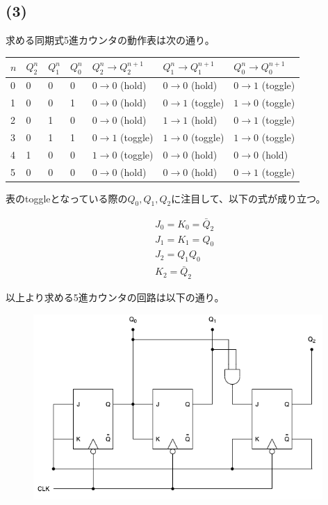 \documentclass[a4paper,12pt,xelatex,ja=standard]{bxjsarticle}
\begin{document}
\subsection*{(3)}

求める同期式5進カウンタの動作表は次の通り。

\begin{table}[H]
  \centering
  \begin{tabular}{|l|l|l|l|l|l|l|}
  \hline
  $n$ & $Q^n_2$ & $Q^n_1$ & $Q^n_0$ & $Q^n_2 \to Q^{n+1}_2$ & $Q^n_1 \to Q^{n+1}_1$ & $Q^n_0 \to Q^{n+1}_0$ \\ \hline \hline
  0 & 0 & 0 & 0 & $0 \to 0$ (hold)   & $0 \to 0$ (hold)   & $0 \to 1$ (toggle) \\ \hline
  1 & 0 & 0 & 1 & $0 \to 0$ (hold)   & $0 \to 1$ (toggle) & $1 \to 0$ (toggle) \\ \hline
  2 & 0 & 1 & 0 & $0 \to 0$ (hold)   & $1 \to 1$ (hold)   & $0 \to 1$ (toggle) \\ \hline
  3 & 0 & 1 & 1 & $0 \to 1$ (toggle) & $1 \to 0$ (toggle) & $1 \to 0$ (toggle) \\ \hline
  4 & 1 & 0 & 0 & $1 \to 0$ (toggle) & $0 \to 0$ (hold)   & $0 \to 0$ (hold)   \\ \hline
  5 & 0 & 0 & 0 & $0 \to 0$ (hold)   & $0 \to 0$ (hold)   & $0 \to 1$ (toggle) \\ \hline
  \end{tabular}
\end{table}

表のtoggleとなっている際の$Q_0, Q_1, Q_2$に注目して、以下の式が成り立つ。

\begin{equation*}
  \begin{split}
    &J_0 = K_0 = \bar{Q}_2 \\
    &J_1 = K_1 = Q_0 \\
    &J_2 = Q_1 Q_0 \\
    &K_2 = \bar{Q}_2
  \end{split}
\end{equation*}

以上より求める5進カウンタの回路は以下の通り。

\begin{figure}[H]
  \centering
  \includegraphics[width=11cm]{images/5_counter.png}
\end{figure}
\end{document}
